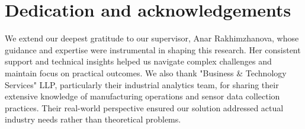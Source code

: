 \chapter{Dedication and acknowledgements}
\begin{SingleSpace}
We extend our deepest gratitude to our supervisor, Anar Rakhimzhanova, whose guidance and expertise were instrumental in shaping this research. Her consistent support and technical insights helped us navigate complex challenges and maintain focus on practical outcomes. We also thank "Business \& Technology Services" LLP, particularly their industrial analytics team, for sharing their extensive knowledge of manufacturing operations and sensor data collection practices. Their real-world perspective ensured our solution addressed actual industry needs rather than theoretical problems.
\end{SingleSpace}
\clearpage